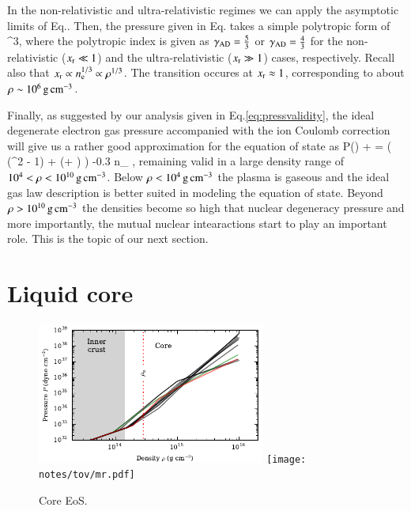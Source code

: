 In the non-relativistic and ultra-relativistic regimes we can apply the asymptotic limits of Eq..
Then, the pressure given in Eq. takes a simple polytropic form of
\be
\Peid \approx \frac{ \Pressr }{9\pi^2 \gammaad} \xr^{3\gammaad},
\ee
where the polytropic index is given as $\gamma_{\mathrm{AD}} = \frac{5}{3}$ or $\gamma_{\mathrm{AD}} = \frac{4}{3}$ for the non-relativistic ($x_{\mathrm{r}} \ll 1$) and the ultra-relativistic ($x_{\mathrm{r}} \gg 1$) cases, respectively.
Recall also that $x_{\mathrm{r}} \propto n_{\mathrm{e}}^{1/3} \propto \rho^{1/3}$.
The transition occures at $x_{\mathrm{r}} \approx 1$, corresponding to about $\rho \sim 10^6 \, \mathrm{g}\,\mathrm{cm}^{-3}$.

Finally, as suggested by our analysis given in Eq.\eqref{eq:pressvalidity}, the ideal degenerate electron gas pressure accompanied with the ion Coulomb correction will give us a rather good approximation for the equation of state as
\be
P(\xr) \approx \Peid + \Pii =  \left( (\xr^2 - 1) \gammar + \ln(\xr + \gammar) \right) -0.3 n_{} ,
\ee
remaining valid in a large density range of $10^{4} < \rho < 10^{10} \, \mathrm{g}\,\mathrm{cm}^{-3}$.
Below $\rho < 10^{4} \, \mathrm{g}\,\mathrm{cm}^{-3}$ the plasma is gaseous and the ideal gas law description  is better suited in modeling the equation of state.
Beyond $\rho > 10^{10} \, \mathrm{g}\,\mathrm{cm}^{-3}$ the densities become so high that nuclear degeneracy pressure and more importantly, the mutual nuclear intearactions start to play an important role.
This is the topic of our next section.


%




\section{Liquid core}\label{sect:core}
\begin{figure}
\centering
\includegraphics[width=7.5cm]{notes/eos/dense_eos.pdf}
\texttt{[image: notes/tov/mr.pdf]}
\caption{\label{fig:core}
Core EoS.
}
\end{figure}


